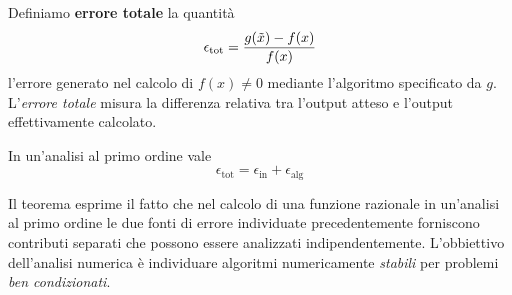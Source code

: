 \begin{definition}
	Definiamo \textbf{errore totale} la quantità
	\[ \epsilon_{\text{tot}} = \frac{g(\tilde{x}) - f(x)}{f(x)} \]
	l'errore generato nel calcolo di $f(x) \neq 0$ mediante l'algoritmo specificato da $g$. L'\emph{errore totale}
	misura la differenza relativa tra l'output atteso e l'output effettivamente calcolato.
\end{definition}

\begin{theorem}
	In un'analisi al primo ordine vale
	\[ \epsilon_{\text{tot}} = \epsilon_{\text{in}} + \epsilon_{\text{alg}} \]
\end{theorem}

Il teorema esprime il fatto che nel calcolo di una funzione razionale in un'analisi al primo ordine le due fonti
di errore individuate precedentemente forniscono contributi separati che possono essere analizzati
indipendentemente. L'obbiettivo dell'analisi numerica è individuare algoritmi numericamente \emph{stabili} per
problemi \emph{ben condizionati}.